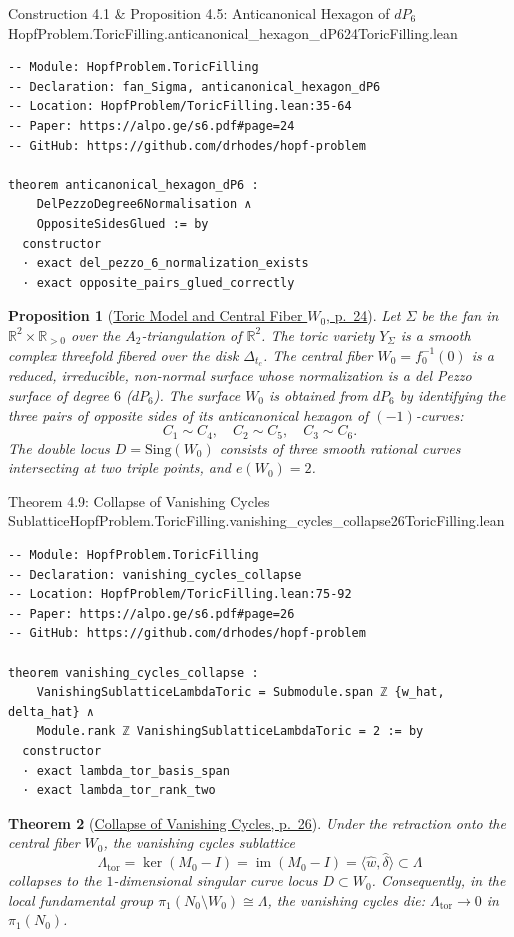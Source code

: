\documentclass[10pt]{article}
\newtheorem{theorem}{Theorem}[section]
\newtheorem{proposition}[theorem]{Proposition}
\newcommand{\dbR}{\mathbb{R}}
\newcommand{\im}{\operatorname{im}}
\gdef\hashchar{#}
\newcommand{\paperref}[2]{\href{https://alpo.ge/s6.pdf\hashchar page=#1}{#2}}
\begin{document}
\begin{comparativeblock}{Construction 4.1 \& Proposition 4.5: Anticanonical Hexagon of $dP_6$}{HopfProblem.ToricFilling.anticanonical_hexagon_dP6}{24}{ToricFilling.lean}
\begin{verbatim}
-- Module: HopfProblem.ToricFilling
-- Declaration: fan_Sigma, anticanonical_hexagon_dP6
-- Location: HopfProblem/ToricFilling.lean:35-64
-- Paper: https://alpo.ge/s6.pdf#page=24
-- GitHub: https://github.com/drhodes/hopf-problem

theorem anticanonical_hexagon_dP6 :
    DelPezzoDegree6Normalisation ∧
    OppositeSidesGlued := by
  constructor
  · exact del_pezzo_6_normalization_exists
  · exact opposite_pairs_glued_correctly
\end{verbatim}
\tcblower
\begin{proposition}[\paperref{24}{Toric Model and Central Fiber $W_0$, p.~24}]\label{prop:toric-model}
Let $\Sigma$ be the fan in $\dbR^2 \times \dbR_{>0}$ over the $A_2$-triangulation of $\dbR^2$.
The toric variety $Y_\Sigma$ is a smooth complex threefold fibered over the disk $\Delta_{t_c}$.
The central fiber $W_0 = f_0^{-1}(0)$ is a reduced, irreducible, non-normal surface whose normalization is a del Pezzo surface of degree $6$ ($dP_6$).
The surface $W_0$ is obtained from $dP_6$ by identifying the three pairs of opposite sides of its anticanonical hexagon of $(-1)$-curves:
\[
C_1 \sim C_4, \quad C_2 \sim C_5, \quad C_3 \sim C_6.
\]
The double locus $D = \mathrm{Sing}(W_0)$ consists of three smooth rational curves intersecting at two triple points, and $e(W_0) = 2$.
\end{proposition}
\end{comparativeblock}

\begin{comparativeblock}{Theorem 4.9: Collapse of Vanishing Cycles Sublattice}{HopfProblem.ToricFilling.vanishing_cycles_collapse}{26}{ToricFilling.lean}
\begin{verbatim}
-- Module: HopfProblem.ToricFilling
-- Declaration: vanishing_cycles_collapse
-- Location: HopfProblem/ToricFilling.lean:75-92
-- Paper: https://alpo.ge/s6.pdf#page=26
-- GitHub: https://github.com/drhodes/hopf-problem

theorem vanishing_cycles_collapse :
    VanishingSublatticeLambdaToric = Submodule.span ℤ {w_hat, delta_hat} ∧
    Module.rank ℤ VanishingSublatticeLambdaToric = 2 := by
  constructor
  · exact lambda_tor_basis_span
  · exact lambda_tor_rank_two
\end{verbatim}
\tcblower
\begin{theorem}[\paperref{26}{Collapse of Vanishing Cycles, p.~26}]\label{thm:vanishing-cycles}
Under the retraction onto the central fiber $W_0$, the vanishing cycles sublattice
\[
\Lambda_{\mathrm{tor}} = \ker(M_0 - I) = \im(M_0 - I) = \langle \hat w, \hat\delta \rangle \subset \Lambda
\]
collapses to the $1$-dimensional singular curve locus $D \subset W_0$.
Consequently, in the local fundamental group $\pi_1(N_0 \setminus W_0) \cong \Lambda$, the vanishing cycles die: $\Lambda_{\mathrm{tor}} \to 0$ in $\pi_1(N_0)$.
\end{theorem}
\end{comparativeblock}
\end{document}
